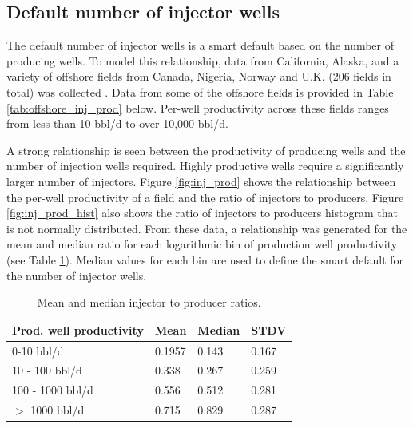 \documentclass[11pt]{report}
\begin{document}
\subsection{Default number of injector wells}

The default number of injector wells is a smart default based on the number of producing wells. To model this relationship, data from California, Alaska, and a variety of offshore fields from Canada, Nigeria, Norway and U.K. (206 fields in total) was collected \cite{DOGGR2011, AOGCC2012a}. Data from some of the offshore fields is provided in Table \ref{tab:offshore_inj_prod} below. Per-well productivity across these fields ranges from less than 10 bbl/d to over 10,000 bbl/d.

A strong relationship is seen between the productivity of producing wells and the number of injection wells required. Highly productive wells require a significantly larger number of injectors. Figure \ref{fig:inj_prod} shows the relationship between the per-well productivity of a field and the ratio of injectors to producers. Figure \ref{fig:inj_prod_hist} also shows the ratio of injectors to producers histogram that is not normally distributed. From these data, a relationship was generated for the mean and median ratio for each logarithmic bin of production well productivity (see Table \ref{tab:inj_prod_ratios}). Median values for each bin are used to define the smart default for the number of injector wells.

\begin{table}
\begin{scriptsize}
\caption{Mean and median injector to producer ratios.}
\label{tab:inj_prod_ratios}
\begin{tabular*}{0.8\columnwidth}{p{}p{}p{}p{}}
\toprule
Prod. well productivity & Mean & Median & STDV \\
\midrule
0-10 bbl/d & 0.1957 & 0.143 & 0.167 \\
10 - 100 bbl/d & 0.338 & 0.267 & 0.259 \\
100 - 1000 bbl/d & 0.556 & 0.512 & 0.281 \\
$>$ 1000 bbl/d & 0.715 & 0.829 & 0.287 \\
\bottomrule
\end{tabular*}
\end{scriptsize}
\end{table}
\end{document}
